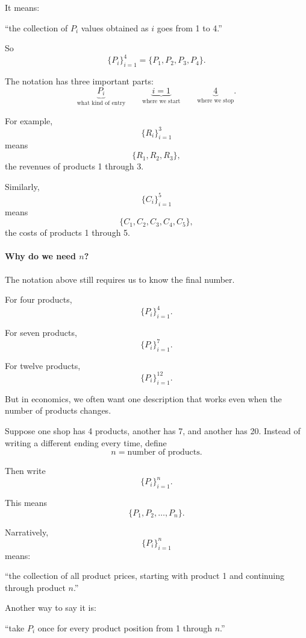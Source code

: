 	It means:
	
	\begin{center}
		``the collection of $P_i$ values obtained as $i$ goes from 1 to 4.''
	\end{center}
	
	So
	\[
	\{P_i\}_{i=1}^{4}
	=
	\{P_1,P_2,P_3,P_4\}.
	\]
	
	The notation has three important parts:
	\[
	\underbrace{P_i}_{\text{what kind of entry}}
	\qquad
	\underbrace{i=1}_{\text{where we start}}
	\qquad
	\underbrace{4}_{\text{where we stop}}.
	\]
	
	For example,
	\[
	\{R_i\}_{i=1}^{3}
	\]
	means
	\[
	\{R_1,R_2,R_3\},
	\]
	the revenues of products 1 through 3.
	
	Similarly,
	\[
	\{C_i\}_{i=1}^{5}
	\]
	means
	\[
	\{C_1,C_2,C_3,C_4,C_5\},
	\]
	the costs of products 1 through 5.
	
	\paragraph{Why do we need $n$?}
	
	The notation above still requires us to know the final number.
	
	For four products,
	\[
	\{P_i\}_{i=1}^{4}.
	\]
	
	For seven products,
	\[
	\{P_i\}_{i=1}^{7}.
	\]
	
	For twelve products,
	\[
	\{P_i\}_{i=1}^{12}.
	\]
	
	But in economics, we often want one description that works even when the number of products changes.
	
	Suppose one shop has 4 products, another has 7, and another has 20. Instead of writing a different ending every time, define
	\[
	n=\text{number of products}.
	\]
	
	Then write
	\[
	\{P_i\}_{i=1}^{n}.
	\]
	
	This means
	\[
	\{P_1,P_2,\ldots,P_n\}.
	\]
	
	Narratively,
	\[
	\{P_i\}_{i=1}^{n}
	\]
	means:
	
	\begin{center}
		``the collection of all product prices, starting with product 1 and continuing through product $n$.''
	\end{center}
	
	Another way to say it is:
	
	\begin{center}
		``take $P_i$ once for every product position from 1 through $n$.''
	\end{center}
	

